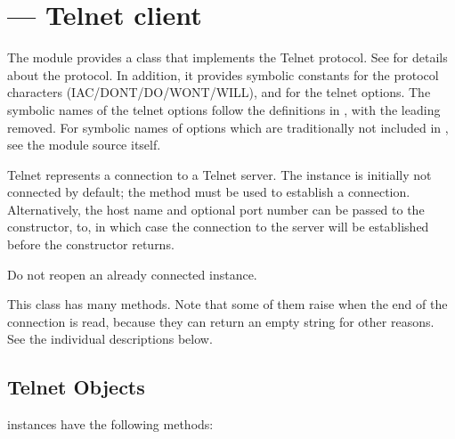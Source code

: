 \section{ ---
         Telnet client}



The  module provides a  class that
implements the Telnet protocol.  See  for details about the
protocol. In addition, it provides symbolic constants for the protocol
characters (IAC/DONT/DO/WONT/WILL), and for the telnet options. The
symbolic names of the telnet options follow the definitions in
, with the leading  removed. For
symbolic names of options which are traditionally not included in
, see the module source itself.


\begin{classdesc}{Telnet}{}
 represents a connection to a Telnet server. The
instance is initially not connected by default; the 
method must be used to establish a connection.  Alternatively, the
host name and optional port number can be passed to the constructor,
to, in which case the connection to the server will be established
before the constructor returns.

Do not reopen an already connected instance.

This class has many  methods.  Note that some of them 
raise  when the end of the connection is read,
because they can return an empty string for other reasons.  See the
individual descriptions below.
\end{classdesc}


\begin{seealso}
\end{seealso}



\subsection{Telnet Objects \label{telnet-objects}}

 instances have the following methods:


